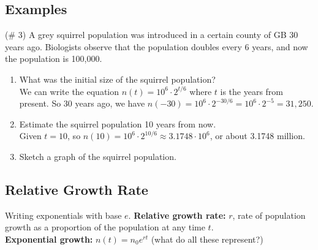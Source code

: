 \documentclass{tufte-handout}
\begin{document}
\subsection{Examples}
%
(\# 3) A grey squirrel population was introduced in a certain county of GB 30 years ago.
Biologists observe that the population doubles every 6 years, and now the population is 100,000.
\begin{enumerate}
\item What was the initial size of the squirrel population? \\
{\color{blue} We can write the equation $n(t) = 10^6 \cdot 2^{t/6}$ where $t$ is the years from present. 
So $30$ years ago, we have $n(-30) = 10^6 \cdot 2^{-30/6} = 10^6 \cdot 2^{-5} = 31,250$.}
\item Estimate the squirrel population 10 years from now. \\
{\color{blue} Given $t = 10$, so $n(10) = 10^6 \cdot 2^{10/6} \approx 3.1748\cdot 10^6$, or about 3.1748 million.}
\item Sketch a graph of the squirrel population.
\end{enumerate}

\subsection{Relative Growth Rate}
Writing exponentials with base $e$.
\textbf{Relative growth rate:} $r$, rate of population growth as a proportion of the population at any time $t$. \\
\textbf{Exponential growth:} $n(t) = n_0 e^{rt}$ (what do all these represent?)
\end{document}
